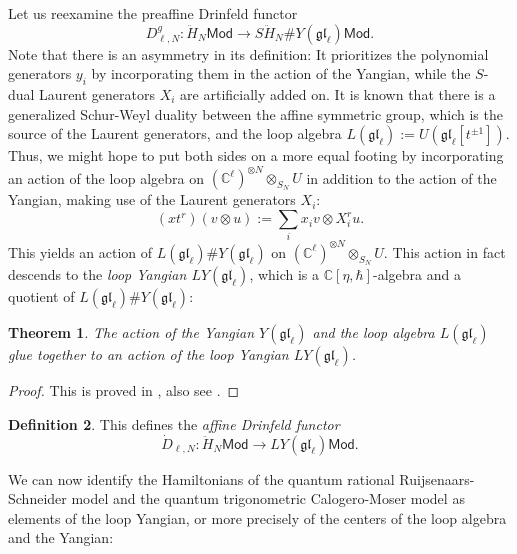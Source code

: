 \documentclass[11pt]{report}
\newtheorem{theorem}{Theorem}[section]
\theoremstyle{definition}
\newtheorem{definition}[theorem]{Definition}
\theoremstyle{remark}
\theoremstyle{remark}
\newcommand{\C}{\mathbb{C}}
\begin{document}
Let us reexamine the preaffine Drinfeld functor
\begin{equation*}
D_{\ell,N}^g: \ddot H_N\mathsf{Mod} \to S\ddot H_N \# Y(\mathfrak{gl}_\ell) \mathsf{Mod}.
\end{equation*}
Note that there is an asymmetry in its definition: It prioritizes the polynomial generators $y_i$ by incorporating them in the action of the Yangian, while the $S$-dual Laurent generators $X_i$ are artificially added on. It is known that there is a generalized Schur-Weyl duality between the affine symmetric group, which is the source of the Laurent generators, and the loop algebra $L(\mathfrak{gl}_\ell) := U(\mathfrak{gl}_\ell[t^{\pm 1}])$. Thus, we might hope to put both sides on a more equal footing by incorporating an action of the loop algebra on $(\C^\ell)^{\otimes N} \otimes_{S_N} U$ in addition to the action of the Yangian, making use of the Laurent generators $X_i$:
\begin{equation*}
(x t^r)(v \otimes u) := \sum_i x_i v \otimes X_i^r u.
\end{equation*}
This yields an action of $L(\mathfrak{gl}_\ell) \# Y(\mathfrak{gl}_\ell)$ on $(\C^\ell)^{\otimes N} \otimes_{S_N} U$. This action in fact descends to the \emph{loop Yangian $LY(\mathfrak{gl}_\ell)$}, which is a $\C[\eta,\hbar]$-algebra and a quotient of $L(\mathfrak{gl}_\ell) \# Y(\mathfrak{gl}_\ell)$:

\begin{theorem}
The action of the Yangian $Y(\mathfrak{gl}_\ell)$ and the loop algebra $L(\mathfrak{gl}_\ell)$ glue together to an action of the loop Yangian $LY(\mathfrak{gl}_\ell)$.
\end{theorem}

\begin{proof}
This is proved in \cite{article:guay:2005}, also see \cite{article:kodera:2016}.
\end{proof}

\begin{definition}
This defines the \emph{affine Drinfeld functor}
\begin{equation*}
\dot D_{\ell,N}: \ddot H_N\mathsf{Mod} \to LY(\mathfrak{gl}_\ell) \mathsf{Mod}.
\end{equation*}
\end{definition}

We can now identify the Hamiltonians of the quantum rational Ruijsenaars-Schneider model and the quantum trigonometric Calogero-Moser model as elements of the loop Yangian, or more precisely of the centers of the loop algebra and the Yangian:
\end{document}
